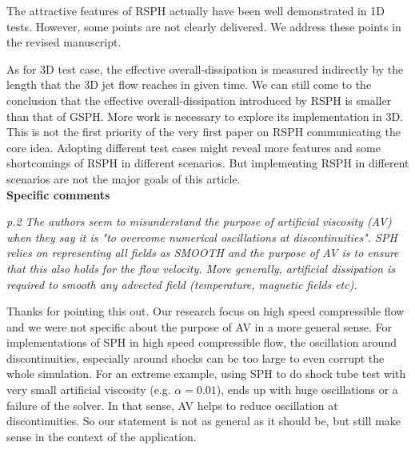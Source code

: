 \documentclass[10pt,a4paper]{article}
\begin{document}
The attractive features of RSPH actually have been well demonstrated in 1D tests. However, some points are not clearly delivered. We address these points in the revised manuscript.

As for 3D test case, the effective overall-dissipation is measured indirectly by the length that the 3D jet flow reaches in given time. We can still come to the conclusion that the effective overall-dissipation introduced by RSPH is smaller than that of GSPH. More work is necessary to explore its implementation in 3D. This is not the first priority of the very first paper on RSPH communicating the core idea. Adopting different test cases might reveal more features and some shortcomings of RSPH in different scenarios. But implementing RSPH in different scenarios are not the major goals of this article.
\\[12pt]

\textbf{\large Specific comments}

\textit{p.2 The authors seem to misunderstand the purpose of artificial viscosity (AV) when they say it is "to overcome numerical oscillations at
discontinuities". SPH relies on representing all fields as SMOOTH and the purpose of AV is to ensure that this also holds for the flow velocity.
More generally, artificial dissipation is required to smooth any advected field (temperature, magnetic fields etc).}

Thanks for pointing this out. Our research focus  on high speed compressible flow and we were not specific about the purpose of  AV in a more general sense. For implementations of SPH in high speed compressible flow, the oscillation around discontinuities, especially around shocks can be too large to even corrupt the whole simulation. For an extreme example, using SPH to do shock tube test with very small artificial viscosity (e.g. $\alpha = 0.01$),  ends up with huge oscillations or a failure of the solver. In that sense, AV helps to reduce oscillation at discontinuities. So our statement is not as general as it should be, but still make sense in the context of the application.
\\[3pt]
\end{document}
